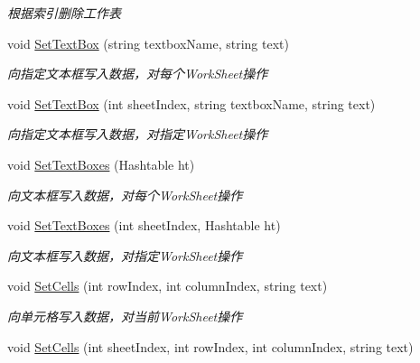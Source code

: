 \begin{DoxyCompactItemize}
\begin{DoxyCompactList}\small\item\em 根据索引删除工作表 \end{DoxyCompactList}\item 
void \hyperlink{class_x_c_l_net_tools_1_1_office_1_1_excel_handler_1_1_excel_helper_a5ae2a9cc10bd517ae122b9f74608d28f}{Set\+Text\+Box} (string textbox\+Name, string text)
\begin{DoxyCompactList}\small\item\em 向指定文本框写入数据，对每个\+Work\+Sheet操作 \end{DoxyCompactList}\item 
void \hyperlink{class_x_c_l_net_tools_1_1_office_1_1_excel_handler_1_1_excel_helper_ae6999962417a5ac284af99ef3305c14e}{Set\+Text\+Box} (int sheet\+Index, string textbox\+Name, string text)
\begin{DoxyCompactList}\small\item\em 向指定文本框写入数据，对指定\+Work\+Sheet操作 \end{DoxyCompactList}\item 
void \hyperlink{class_x_c_l_net_tools_1_1_office_1_1_excel_handler_1_1_excel_helper_abb6a218200a17f2be52b999e5d458df5}{Set\+Text\+Boxes} (Hashtable ht)
\begin{DoxyCompactList}\small\item\em 向文本框写入数据，对每个\+Work\+Sheet操作 \end{DoxyCompactList}\item 
void \hyperlink{class_x_c_l_net_tools_1_1_office_1_1_excel_handler_1_1_excel_helper_afcac92ace2a349e193920ad28101dd0e}{Set\+Text\+Boxes} (int sheet\+Index, Hashtable ht)
\begin{DoxyCompactList}\small\item\em 向文本框写入数据，对指定\+Work\+Sheet操作 \end{DoxyCompactList}\item 
void \hyperlink{class_x_c_l_net_tools_1_1_office_1_1_excel_handler_1_1_excel_helper_ad69661f169802e75d2ff920d5935f99e}{Set\+Cells} (int row\+Index, int column\+Index, string text)
\begin{DoxyCompactList}\small\item\em 向单元格写入数据，对当前\+Work\+Sheet操作 \end{DoxyCompactList}\item 
void \hyperlink{class_x_c_l_net_tools_1_1_office_1_1_excel_handler_1_1_excel_helper_a8344816c7157ec0b4a2d4c7ca9e3bd4c}{Set\+Cells} (int sheet\+Index, int row\+Index, int column\+Index, string text)

\end{DoxyCompactItemize}
